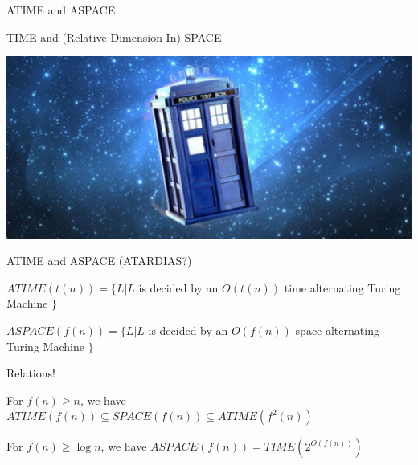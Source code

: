 \documentclass[presentation]{beamer}
\begin{document}
\begin{frame}[label={sec:org6ea825d}]{ATIME and ASPACE}
\begin{block}{TIME and (Relative Dimension In) SPACE}
\begin{center}
\includegraphics[width=.9\linewidth]{./tardis.jpg}
\end{center}
\end{block}
\begin{block}{ATIME and ASPACE (ATARDIAS?)}
\begin{block}{\(ATIME(t(n)) = \{L|L\) is decided by an \(O(t(n))\) time alternating Turing Machine \(\}\)}
\end{block}
\begin{block}{\(ASPACE(f(n)) = \{L|L\) is decided by an \(O(f(n))\) space alternating Turing Machine \(\}\)}
\end{block}
\end{block}
\begin{block}{Relations!}
\begin{block}{For \(f(n) \ge n\), we have \(ATIME(f(n)) \subseteq SPACE(f(n)) \subseteq ATIME(f^{2}(n))\)}
\end{block}
\begin{block}{For \(f(n) \ge \log n\), we have \(ASPACE(f(n)) = TIME(2^{O(f(n))})\)}
\end{block}
\end{block}
\end{frame}
\end{document}
